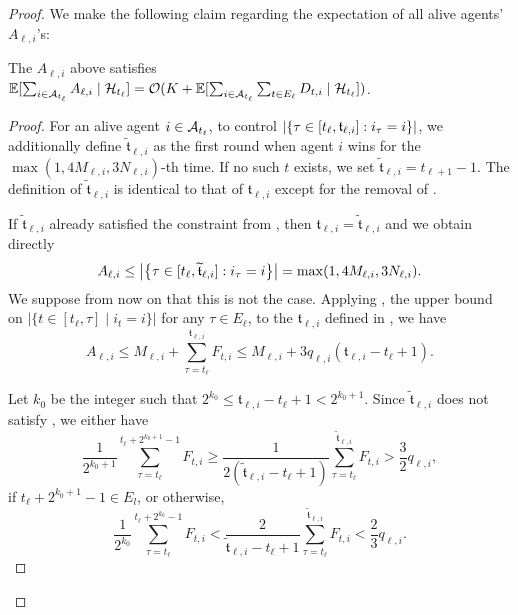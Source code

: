 \begin{proof}
We make the following claim regarding the expectation of all alive agents' $A_{\ell,i}$'s:
\begin{claim}
The $A_{\ell,i}$ above satisfies $\E[\sum_{i\in\mA_{t_\ell}} A_{\ell,i}\mid \mH_{t_\ell}]=\O(K+\E[\sum_{i\in\mA_{t_\ell}} \sum_{t\in E_\ell} D_{t,i}\mid \mH_{t_\ell}])$.
\end{claim}
\begin{proof}
For an alive agent $i\in \mathcal{A}_{t_\ell}$, to control $\left|\left\{  \tau\in[t_\ell,{\mathfrak t}_{\ell,i}]: i_{\tau}=i  \right\}\right|$, we additionally define $\tilde {\mathfrak t}_{\ell,i}$ as the first round when agent $i$ wins for the $\max(1,4M_{\ell,i}, 3N_{\ell,i})$-th time. If no such $t$ exists, we set $\tilde {\mathfrak t}_{\ell,i}=t_{\ell+1}-1$. The definition of $\tilde{\mathfrak t}_{\ell,i}$ is identical to that of $\mathfrak t_{\ell,i}$ except for the removal of .

If $\tilde {\mathfrak t}_{\ell,i}$ already satisfied the constraint from , then $\mathfrak t_{\ell,i}=\tilde{\mathfrak t}_{\ell,i}$ and we obtain directly
\begin{equation}\label{eq:case_1}
    A_{\ell,i}\leq \left|\left\{  \tau\in[t_\ell,\widetilde {\mathfrak t}_{\ell,i}]: i_{\tau}=i  \right\}\right| = \max(1,4M_{\ell,i}, 3N_{\ell,i}).
\end{equation}
We suppose from now on that this is not the case. Applying , the upper bound on $\lvert \{t\in [t_\ell,\tau]\mid i_t=i\}\rvert$ for any $\tau\in E_\ell$, to the $\mathfrak t_{\ell,i}$ defined in , we have
\begin{equation}\label{eq:case_2a}
A_{\ell,i}\leq M_{\ell,i} +\sum_{\tau=t_\ell}^{{\mathfrak t}_{\ell,i}} F_{t,i}  \leq   M_{\ell,i} + 3q_{\ell,i}(\mathfrak t_{\ell,i}-t_\ell+1).
\end{equation}

Let $k_0$ be the integer such that $2^{k_0}\leq \mathfrak t_{\ell,i}-t_\ell+1 <2^{k_0+1}$. Since $\tilde {\mathfrak t}_{\ell,i}$ does not satisfy , we either have
\begin{equation}\label{eq:upper_bound_power_2}
    \frac{1}{ 2^{k_0+1}}\sum_{\tau=t_\ell}^{t_\ell + 2^{k_0+1}-1} F_{t,i} \geq \frac{1}{2(\tilde{\mathfrak t}_{\ell,i} -t_\ell + 1)}\sum_{\tau=t_\ell}^{\tilde{\mathfrak t}_{\ell,i}} F_{t,i} > \frac{3}{2}q_{\ell,i},
\end{equation}
if $t_\ell+2^{k_0+1}-1\in E_l$, or otherwise,
\begin{equation}\label{eq:lower_bound_power_2}
    \frac{1}{ 2^{k_0}}\sum_{\tau=t_\ell}^{t_\ell + 2^{k_0}-1} F_{t,i} < \frac{2}{\tilde{\mathfrak t}_{\ell,i} -t_\ell + 1}\sum_{\tau=t_\ell}^{\tilde{\mathfrak t}_{\ell,i}} F_{t,i} < \frac{2}{3}q_{\ell,i}.
\end{equation}


\end{proof}
\end{proof}
